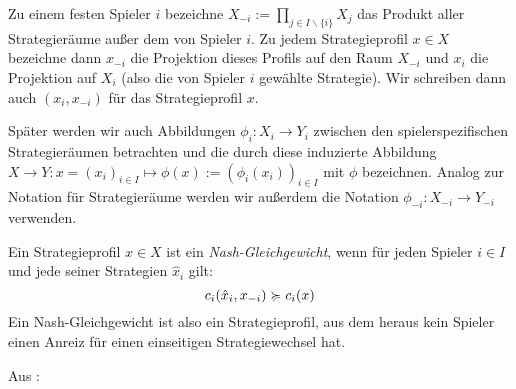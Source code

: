\begin{notation}
	Zu einem festen Spieler $i$ bezeichne $X_{-i} := \prod_{j \in I\backslash\{i\}} X_j$ das Produkt aller Strategieräume außer dem von Spieler $i$. Zu jedem Strategieprofil $x \in X$ bezeichne dann $x_{-i}$ die Projektion dieses Profils auf den Raum $X_{-i}$ und $x_i$ die Projektion auf $X_i$ (also die von Spieler $i$ gewählte Strategie). Wir schreiben dann auch $(x_i, x_{-i})$ für das Strategieprofil $x$.
	
	Später werden wir auch Abbildungen $\phi_i: X_i \to Y_i$ zwischen den spielerspezifischen Strategieräumen betrachten und die durch diese induzierte Abbildung $X \to Y: x = (x_i)_{i \in I} \mapsto \phi(x) := (\phi_i(x_i))_{i \in I}$ mit $\phi$ bezeichnen. Analog zur Notation für Strategieräume werden wir außerdem die Notation $\phi_{-i}: X_{-i} \to Y_{-i}$ verwenden.
\end{notation}

\begin{defn}
	Ein Strategieprofil $x \in X$ ist ein \emph{Nash-Gleichgewicht}, wenn für jeden Spieler $i \in I$ und jede seiner Strategien $\hat{x}_i$ gilt:
		\[c_i(\hat{x}_i, x_{-i}) \succcurlyeq c_i(x)\]
	Ein Nash-Gleichgewicht ist also ein Strategieprofil, aus dem heraus kein Spieler einen Anreiz für einen einseitigen Strategiewechsel hat.	
\end{defn}

Aus \cite{MonShap}:

